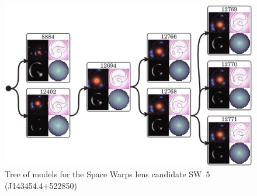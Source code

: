 \documentclass{ws-procs975x65}
\newcommand{\sw}{Space Warps\xspace}
\newcommand{\Msun}{\ensuremath{\text{M}_\odot}\xspace}
\newcommand{\Mlens}{\ensuremath{\text{M}_\text{lens}}\xspace}
\newcommand{\Mstel}{\ensuremath{\text{M}_\odot}\xspace}
\newcommand{\icite}[1]{Ref.~\refcite{#1}}  %
\newcommand{\scite}[1]{\cite{#1}}          %
\newcommand{\SW}[1]{SW~#1\xspace}
\begin{document}
\begin{figure}
  \centering
  \includegraphics[width=\columnwidth]{modeltree}
  \caption{
    Tree of models for the \sw lens candidate \SW{5} (J143454.4+522850)
  }
  \label{fig:tree}
\end{figure}


% 
% 
% 
% 
% 
\end{document}
